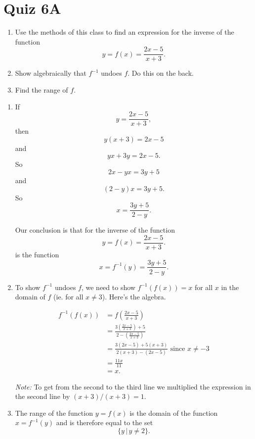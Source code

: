 \documentclass{ximera}
\begin{document}
\section{Quiz 6A}

\begin{question} \label{Q9v93f3}
\begin{enumerate}

\item[(a)] Use the methods of this class to find an expression for the inverse of the function
\[
    y = f(x) = \frac{2x-5}{x+3}.
\]

\item[(b)] Show algebraically that $f^{-1}$ undoes $f$. Do this on the back.

\item[(c)] Find the range of $f$.

\end{enumerate}

\begin{explanation}
\begin{enumerate}
\item If 
\[
 y = \frac{2x-5}{x+3} ,
\]
then
\[
 y(x+3) = 2x - 5
\]
and
\[
  yx + 3y = 2x - 5.
\]
So
\[
 2x - yx = 3y + 5
\]
and
\[
  (2-y)x = 3y + 5.
\]
So
\[
 x = \frac{3y+5}{2-y}.
\]

Our conclusion is that  for the inverse of the function
\[
    y = f(x) = \frac{2x-5}{x+3}.
\]
is the function
\[
x = f^{-1}(y) = \frac{3y+5}{2-y}.
\]

\item To show $f^{-1}$ undoes $f$, we need to show $f^{-1}(f(x)) = x$ for all $x$ in the domain of $f$ (ie. for all $x\neq 3$). Here's the algebra.

\begin{align*}
  f^{-1}(f(x))  &= f \left( \frac{2x-5}{x+3} \right) \\
                     & = \frac{3 \left( \frac{2x-5}{x+3}\right) + 5 }{2 - \left(  \frac{2x-5}{x+3} \right)} \\
                     &= \frac{3(2x-5) + 5(x+3)}{2(x+3) - (2x-5)} \text{ since } x \neq -3 \\
                     &= \frac{11x}{11}\\
                     &=x .
\end{align*}

\emph{Note:} To get from the second to the third line we multiplied the expression in the second line by  $(x+3)/(x+3) = 1$.

\item The range of the function $y=f(x)$ is the domain of the function $x=f^{-1}(y)$ and is therefore equal to the set
\[
  \{  y \, | \, y \neq 2 \}.
\]

\end{enumerate}
\end{explanation}
\end{question}
\end{document}
